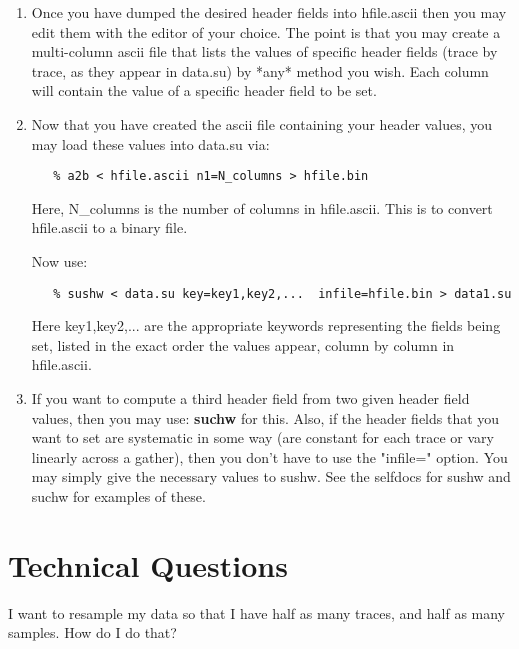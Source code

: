 {{{{{{{\begin{rmans}
\begin{enumerate}
   The strings "key1,key2,..." are the keywords representing the desired
   SEGY trace header fields. These keywords may be listed via:

{\small \begin{verbatim}
   % sukeyword -o
\end{verbatim}}

\item Once you have dumped the desired header fields  into  hfile.ascii
   then you may edit them with the editor of your choice. The point
   is that you may create a multi-column ascii file that lists the
   values of specific header fields (trace by trace, as they appear
   in data.su) by *any* method you wish. Each column will contain
   the value of a specific header field to be set.

\item Now that you have created the ascii file containing your header values,
   you may load these values into data.su via:

{\small \begin{verbatim}
   % a2b < hfile.ascii n1=N_columns > hfile.bin
\end{verbatim}} \noindent
   Here,  N\_columns is the number of columns in   hfile.ascii.
   This is to convert hfile.ascii to a binary file.

   Now use:
{\small \begin{verbatim}
   % sushw < data.su key=key1,key2,...  infile=hfile.bin > data1.su
\end{verbatim}} \noindent
   Here   key1,key2,... are the appropriate keywords representing
   the fields being set, listed in the exact order the values appear,
   column by column in hfile.ascii.

\item If you want to compute a third header field from two given header
   field values, then you may use: {\bf suchw} for this.
   Also, if the header fields that you want to set are
   systematic in some way (are constant for each trace or vary
   linearly across a gather), then you don't have to use the
   "infile=" option. You may simply give the
   necessary values to   sushw.   See the selfdocs for   sushw and
   suchw  for examples of these.
\end{enumerate}
\end{rmans}

\section{Technical Questions}
\begin{question}
I want to resample my data so that I have half as many traces, and
half as many samples. How do I do that?
\end{question}

}}}}}}}
